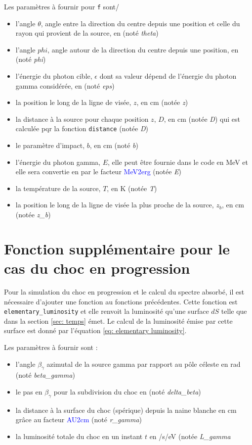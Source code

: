 \documentclass[a4paper,12pt,twoside]{article}
\newcommand{\nocontentsline}[3]{}
\newcommand{\tocless}[2]{\bgroup\let\addcontentsline=\nocontentsline#1{#2}\egroup}
\begin{document}
\begin{appendices}
Les paramètres à fournir pour \texttt{f} sont/
\begin{itemize}
	\item l'angle $\theta$, angle entre la direction du centre depuis une position et celle du rayon qui provient de la source, en \si{\rad} (noté \textit{theta})
    \item l'angle $phi$, angle autour de la direction du centre depuis une position, en \si{\rad} (noté \textit{phi})
    \item l'énergie du photon cible, $\epsilon$ dont sa valeur dépend de l'énergie du photon gamma considérée, en \si{\erg} (noté \textit{eps})
    \item la position le long de la ligne de visée, $z$, en \si{\cm} (notée \textit{z})
    \item la distance à la source pour chaque position $z$, $D$, en \si{\cm} (notée \textit{D}) qui est calculée pqr la fonction \texttt{distance} (notée \textit{D})
    \item le paramètre d'impact, $b$, en \si{\cm} (noté \textit{b})
    \item l'énergie du photon gamma, $E$, elle peut être fournie dans le code en \si{\MeV} et elle sera convertie en \si{\erg} par le facteur \textcolor{blue}{MeV2erg} (notée \textit{E})
    \item la température de la source, $T$, en \si{\K} (notée \textit{T})
    \item la position le long de la ligne de visée la plus proche de la source, $z_b$, en \si{\cm} (notée \textit{z\_b})
\end{itemize}

\tocless\section{Fonction supplémentaire pour le cas du choc en progression}

Pour la simulation du choc en progression et le calcul du spectre absorbé, il est nécessaire d'ajouter une fonction au fonctions précédentes. Cette fonction est \texttt{elementary\_luminosity} et elle renvoit la luminosité qu'une surface $dS$ telle que dans la section \ref{sec: temps} émet. Le calcul de la luminosité émise par cette surface est donné par l'équation \ref{eq: elementary luminosity}.

Les paramètres à fournir sont :
\begin{itemize}
	\item l'angle $\beta_\gamma$ azimutal de la source gamma par rapport au pôle céleste en \si{rad} (noté \textit{beta\_gamma})
    \item le pas en $\beta_\gamma$ pour la subdivision du choc en \si{\rad} (noté \textit{delta\_beta})
    \item la distance à la surface du choc (spérique) depuis la naine blanche en \si{\cm} grâce au facteur \textcolor{blue}{AU2cm} (noté \textit{r\_gamma})
    \item la luminosité totale du choc en un instant $t$ en \si{\erg/\s/\eV} (notée \textit{L\_gamma}
\end{itemize}


\end{appendices}
\end{document}
